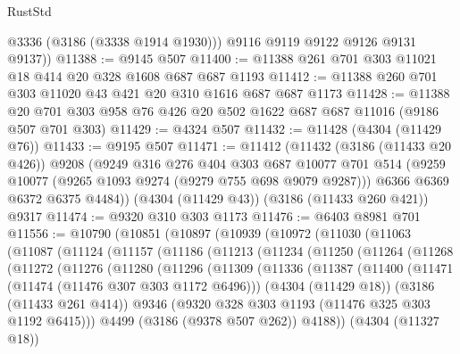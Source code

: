 \begin{lexlean}{RustStd}
\begin{coremodule}
          @3336
          (@3186 (@3338 @1914 @1930)))
        @9116
        @9119
        @9122
        @9126
        @9131
        @9137))
@11388 := @9145 @507
@11400 := @11388 @261 @701 @303 @11021 @18 @414 @20 @328 @1608 @687 @687 @1193
@11412 := @11388 @260 @701 @303 @11020 @43 @421 @20 @310 @1616 @687 @687 @1173
@11428 := @11388 @20 @701 @303 @958 @76 @426 @20 @502 @1622 @687 @687 @11016 (@9186 @507 @701 @303)
@11429 := @4324 @507
@11432 := @11428 (@4304 (@11429 @76))
@11433 := @9195 @507
@11471 := @11412
    (@11432
      (@3186 (@11433 @20 @426))
      @9208
      (@9249
        @316
        @276
        @404
        @303
        @687
        @10077
        @701
        @514
        (@9259 @10077 (@9265 @1093 @9274 (@9279 @755 @698 @9079 @9287)))
        @6366
        @6369
        @6372
        @6375
        @4484))
    (@4304 (@11429 @43))
    (@3186 (@11433 @260 @421))
    @9317
@11474 := @9320 @310 @303 @1173
@11476 := @6403 @8981 @701
@11556 := @10790
    (@10851
      (@10897
        (@10939
          (@10972
            (@11030
              (@11063
                (@11087
                  (@11124
                    (@11157
                      (@11186
                        (@11213
                          (@11234
                            (@11250
                              (@11264
                                (@11268
                                  (@11272
                                    (@11276
                                      (@11280
                                        (@11296
                                          (@11309
                                            (@11336
                                              (@11387
                                                (@11400
                                                  (@11471 (@11474 (@11476 @307 @303 @1172 @6496)))
                                                  (@4304 (@11429 @18))
                                                  (@3186 (@11433 @261 @414))
                                                  @9346
                                                  (@9320
                                                    @328
                                                    @303
                                                    @1193
                                                    (@11476 @325 @303 @1192 @6415)))
                                                @4499
                                                (@3186 (@9378 @507 @262))
                                                @4188))
                                            (@4304 (@11327 @18))

\end{coremodule}
\end{lexlean}
